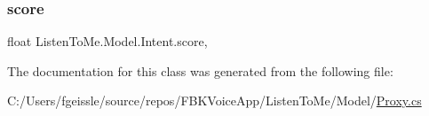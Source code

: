 \mbox{\label{class_listen_to_me_1_1_model_1_1_intent_a82e80d6b2c310b22beacb60637a03d20}} 
\subsubsection{\texorpdfstring{score}{score}}
{\footnotesize\ttfamily float Listen\+To\+Me.\+Model.\+Intent.\+score\hspace{0.3cm}{\ttfamily [get]}, {\ttfamily [set]}}



The documentation for this class was generated from the following file\+:\begin{DoxyCompactItemize}
\item 
C\+:/\+Users/fgeissle/source/repos/\+F\+B\+K\+Voice\+App/\+Listen\+To\+Me/\+Model/\mbox{\hyperlink{_proxy_8cs}{Proxy.\+cs}}\end{DoxyCompactItemize}
